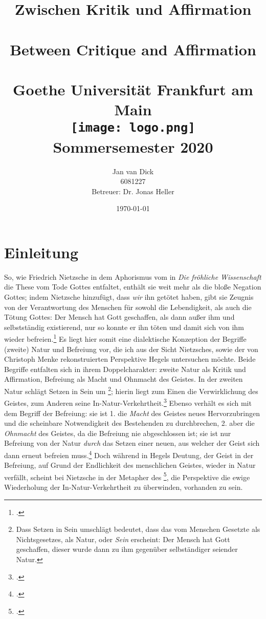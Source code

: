\documentclass[12pt, a4paper, openany]{report}
\title{
    {\textbf{Zwischen Kritik und Affirmation}}\\ 
    {\large \color{darkgray}{Zweite Natur und Befreiung bei Hegel und Nietzsche}}\\
    {\bigskip}
    {\textbf{Between Critique and Affirmation}}\\
    {\large \color{darkgray}{Second Natur and Liberation in the Philosophies of Hegel and Nietzsche}}\\
    {\bigskip}
    {\large Goethe Universität Frankfurt am Main}\\
    {\bigskip}    
    {\bigskip}
    {\bigskip}    
    {\texttt{[image: logo.png]}}\\
    {\bigskip}    
    {Sommersemester 2020}\\
}
\author{
    {Jan van Dick}\\
    {6081227}\\
    {Betreuer: Dr. Jonas Heller}
}
\date{\today}
\begin{document}
\maketitle
\frontmatter

\onehalfspacing
\tableofcontents

\mainmatter

\chapter{Einleitung}
So, wie Friedrich Nietzsche in dem Aphorismus vom  in \emph{Die fröhliche Wissenschaft} die These vom Tode Gottes entfaltet, enthält sie weit mehr als die bloße Negation Gottes;
indem Nietzsche hinzufügt, dass \emph{wir} ihn getötet haben, gibt sie Zeugnis von der Verantwortung des Menschen für sowohl die Lebendigkeit, als auch die Tötung Gottes: 
Der Mensch hat Gott geschaffen, als dann außer ihm und selbstständig existierend, nur so konnte er ihn töten und damit sich von ihm wieder befreien.\footcite[Vgl.][S. 481.]{nietzsche_morgenrote_1999}
Es liegt hier somit eine dialektische Konzeption der Begriffe (zweite) Natur und Befreiung vor, die ich aus der Sicht Nietzsches, sowie der von Christoph Menke rekonstruierten Perspektive Hegels untersuchen möchte.
Beide Begriffe entfalten sich in ihrem Doppelcharakter: zweite Natur als Kritik und Affirmation, Befreiung als Macht und Ohnmacht des Geistes.
In der zweiten Natur schlägt Setzen in Sein um%
\footnote{
    Dass Setzen in Sein umschlägt bedeutet, dass das vom Menschen Gesetzte als Nichtsgesetzes, als Natur, oder \emph{Sein} erscheint: 
    Der Mensch hat Gott geschaffen, dieser wurde dann zu ihm gegenüber selbständiger seiender Natur. 
}; 
hierin liegt zum Einen die Verwirklichung des Geistes, zum Anderen seine In-Natur-Verkehrtheit.\footcite[Vgl.][145]{menke_autonomie_2018}
Ebenso verhält es sich mit dem Begriff der Befreiung: 
sie ist 1. die \emph{Macht} des Geistes neues Hervorzubringen und die scheinbare Notwendigkeit des Bestehenden zu durchbrechen, 
2. aber die \emph{Ohnmacht} des Geistes, da die Befreiung nie abgeschlossen ist; 
sie ist nur Befreiung von der Natur \emph{durch} das Setzen einer neuen, aus welcher der Geist sich dann erneut befreien muss.\footcite[Vgl.][80]{menke_autonomie_2018}
Doch während in Hegels Deutung, der Geist in der Befreiung, auf Grund der Endlichkeit des menschlichen Geistes, wieder in Natur verfällt, scheint bei Nietzsche in der Metapher des \footcite[Vgl.][574]{nietzsche_morgenrote_1999}, die Perspektive die ewige Wiederholung der In-Natur-Verkehrtheit zu überwinden, vorhanden zu sein.
\end{document}
